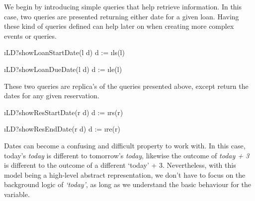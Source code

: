 \documentclass[12pt,a4paper]{article}
\begin{document}

\medskip\noindent We begin by introducing simple queries that help retrieve information. In this case, two queries are presented returning either date for a given loan. Having these kind of queries defined can help later on when creating more complex events or queries.

\begin{showspecs}
	\begin{spec}{\i{LD?showLoanStartDate(l \to d)}}
		d := \i{ls}(l)
	\end{spec}

\showbeside

	\begin{spec}{\i{LD?showLoanDueDate(l \to d)}}
		d := \i{le}(l)
	\end{spec}
\end{showspecs}

\pagebreak

\medskip\noindent These two queries are replica's of the queries presented above, except return the dates for any given reservation.
		
\begin{showspecs}
	\begin{spec}{\i{LD?showResStartDate(r \to d)}}
		d := \i{rs}(r)		
	\end{spec}
	
\showbeside	
	
	\begin{spec}{\i{LD?showResEndDate(r \to d)}}
		d := \i{re}(r)
	\end{spec}	
\end{showspecs}	

\iffalse
\medskip\noindent With the introduction of reservations being associated with dates, we need to record the date when the reservation was made. Events allow this to be possible, and having the variable \emph{today} we can store the date the reservation was made.

\begin{showspecs}
	\begin{spec}{\i{LD!setResDate(r)}}
		r: reserve
	\post
		rd'(r) = today
	\end{spec}
\end{showspecs}

\fi


\medskip\noindent Dates can become a confusing and difficult property to work with. In this case, today's \emph{today} is different to tomorrow's \emph{today}, likewise the outcome of \emph{today + 3} is different to the outcome of a different `today' + 3. Nevertheless, with this model being a high-level abstract representation, we don't have to focus on the background logic of \emph{`today'}, as long as we understand the basic behaviour for the variable.
\end{document}
